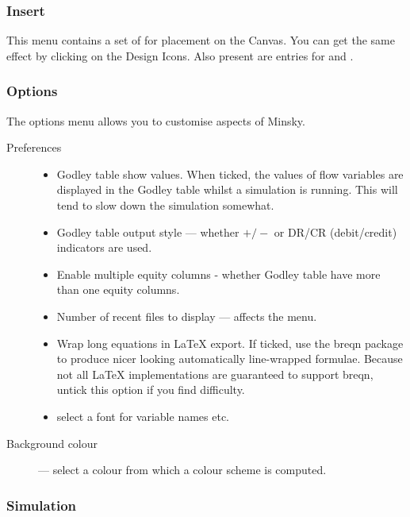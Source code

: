 \subsubsection{Insert}
\label{Insert}

This menu contains a set of  for placement on the Canvas. You can get the same
effect by clicking on the Design Icons. Also present are entries for
 and .


\subsubsection{Options}
\label{Options}

The options menu allows you to customise aspects of Minsky.

\begin{description}
\item[Preferences]\mbox{}

\begin{itemize}
\item Godley table show values. When ticked, the values of flow
variables are displayed in the Godley table whilst a simulation is
running. This will tend to slow down the simulation somewhat.
\item Godley table output style --- whether $+/-$ or DR/CR (debit/credit)
  indicators are used.
\item Enable multiple equity columns - whether Godley table have more
  than one equity columns.
\item Number of recent files to display --- affects the  menu.
\item\label{wrap-equations} Wrap long equations in LaTeX export. If ticked, use the breqn
package to produce nicer looking automatically line-wrapped
formulae. Because not all LaTeX implementations are guaranteed to
support breqn, untick this option if you find difficulty.
\item\label{font} select a font for variable names etc.
\end{itemize}

\item[Background colour] --- select a colour from which a colour scheme
is computed.

\end{description}

\subsubsection{Simulation}
\label{RungeKutta}

